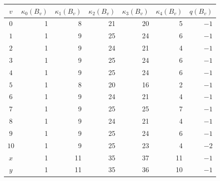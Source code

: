 \begin{tabular}{crrrrrr}
\toprule
\(v\)&\(\kappa_0(B_v)\)&\(\kappa_1(B_v)\)&\(\kappa_2(B_v)\)&\(\kappa_3(B_v)\)&\(\kappa_4(B_v)\)&\(q(B_v)\)\\\midrule
$0$&1&8&21&20&5&$-1$\\
$1$&1&9&25&24&6&$-1$\\
$2$&1&9&24&21&4&$-1$\\
$3$&1&9&25&24&6&$-1$\\
$4$&1&9&25&24&6&$-1$\\
$5$&1&8&20&16&2&$-1$\\
$6$&1&9&24&21&4&$-1$\\
$7$&1&9&25&25&7&$-1$\\
$8$&1&9&24&21&4&$-1$\\
$9$&1&9&25&24&6&$-1$\\
$10$&1&9&25&23&4&$-2$\\
$x$&1&11&35&37&11&$-1$\\
$y$&1&11&35&36&10&$-1$\\
\bottomrule
\end{tabular}
